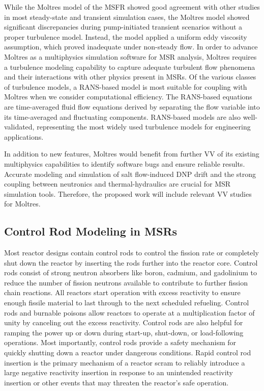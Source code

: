 While the Moltres
model of the \gls{MSFR} showed good agreement with other studies in most steady-state and transient
simulation cases, the Moltres model showed significant discrepancies during pump-initiated
transient scenarios without a proper turbulence model. Instead, the model applied a
uniform eddy viscosity assumption, which proved inadequate under non-steady flow. In order to
advance Moltres as a multiphysics simulation software for \gls{MSR} analysis, Moltres requires a
turbulence modeling capability to capture adequate turbulent flow phenomena and their interactions
with other physics present in \glspl{MSR}. Of the various classes of turbulence models, a
\gls{RANS}-based model is most suitable for coupling with Moltres when we consider computational
efficiency. The \gls{RANS}-based equations are time-averaged fluid flow equations
derived by separating the flow variable into its time-averaged and fluctuating components.
\gls{RANS}-based models are also well-validated, representing the most widely used turbulence
models for engineering applications.

In addition to new features, Moltres would benefit from further \gls{VV} of its existing
multiphysics capabilities to identify software bugs and ensure reliable results. Accurate modeling
and simulation of salt flow-induced \gls{DNP} drift and the strong coupling between neutronics and
thermal-hydraulics are crucial for \gls{MSR} simulation tools. Therefore, the
proposed work will include relevant \gls{VV} studies for Moltres.

\subsection{Control Rod Modeling in \glspl{MSR}}

Most reactor designs contain control rods to control the fission rate or completely shut down the
reactor by inserting the rods further into the reactor core. Control rods consist of
strong neutron absorbers like boron, cadmium, and gadolinium to reduce the number of fission
neutrons available to contribute to further fission chain reactions. All reactors start operation
with excess reactivity to ensure enough fissile material to last through to the next scheduled
refueling. Control rods and burnable poisons allow reactors to operate at a multiplication factor
of unity by canceling out the excess reactivity. Control rods are also helpful
for ramping the power up or down during start-up, shut-down, or load-following operations. Most
importantly, control rods provide a safety mechanism for quickly shutting down a reactor under
dangerous conditions. Rapid control rod insertion is the primary mechanism of a reactor scram to
reliably introduce a large negative reactivity insertion in response to an unintended reactivity
insertion or other events that may threaten the reactor's safe operation. 

